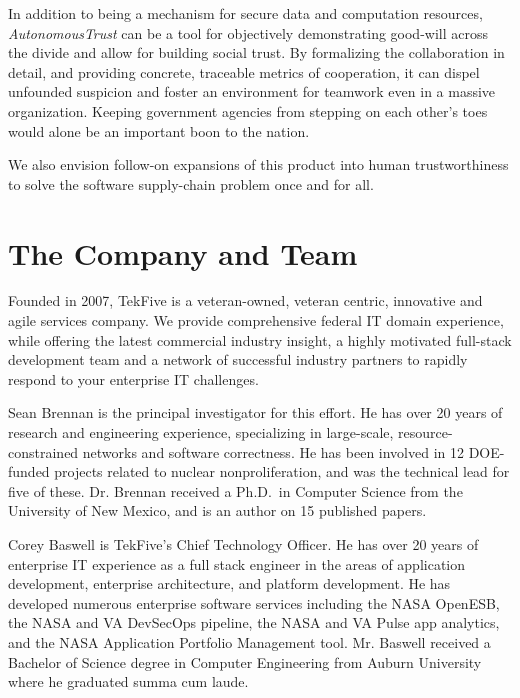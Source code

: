 \documentclass[10pt]{article}
\newcommand{\projectName}{\emph{AutonomousTrust }}
\begin{document}
In addition to being a mechanism for secure data and computation resources, \projectName can be a tool for objectively demonstrating good-will across the divide and allow for building social trust.
By formalizing the collaboration in detail, and providing concrete, traceable metrics of cooperation, it can dispel unfounded suspicion and foster an environment for teamwork even in a massive organization.
Keeping government agencies from stepping on each other's toes would alone be an important boon to the nation.

We also envision follow-on expansions of this product into human trustworthiness to solve the software supply-chain problem once and for all.

\section{The Company and Team}\label{sec:team}

Founded in 2007, TekFive is a veteran-owned, veteran centric, innovative and agile services company.
We provide comprehensive federal IT domain experience, while offering the latest commercial industry insight, a highly motivated full-stack development team and a network of successful industry partners to rapidly respond to your enterprise IT challenges.

Sean Brennan is the principal investigator for this effort.
He has over 20 years of research and engineering experience, specializing in large-scale, resource-constrained networks and software correctness.
He has been involved in 12 DOE-funded projects related to nuclear nonproliferation, and was the technical lead for five of these.
Dr. Brennan received a Ph.D.\ in Computer Science from the University of New Mexico, and is an author on 15 published papers.

Corey Baswell is TekFive's Chief Technology Officer.
He has over 20 years of enterprise IT experience as a full stack engineer in the areas of application development, enterprise architecture, and platform development.
He has developed numerous enterprise software services including the NASA OpenESB, the NASA and VA DevSecOps pipeline, the NASA and VA Pulse app analytics, and the NASA Application Portfolio Management tool.
Mr. Baswell received a Bachelor of Science degree in Computer Engineering from Auburn University where he graduated summa cum laude.
\end{document}
